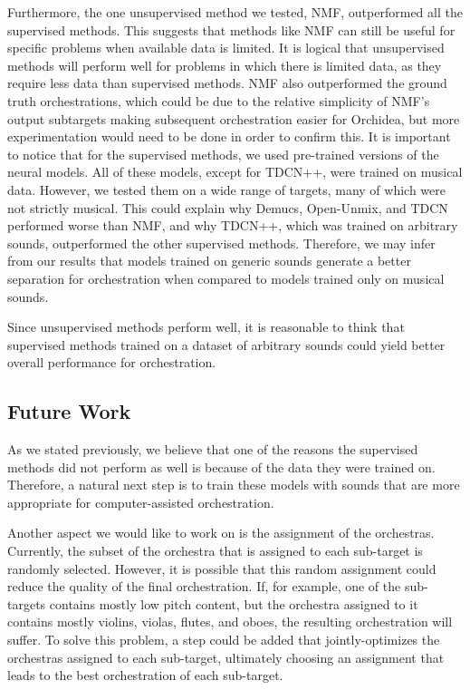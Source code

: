 \documentclass{article}
\begin{document}
  Furthermore, the one unsupervised method we tested, NMF, outperformed all the supervised methods. This suggests that methods like NMF can still be useful for specific problems when available data is limited. It is logical that unsupervised methods will perform well for problems in which there is limited data, as they require less data than supervised methods. NMF also outperformed the ground truth orchestrations, which could be due to the relative simplicity of NMF's output subtargets making subsequent orchestration easier for Orchidea, but more experimentation would need to be done in order to confirm this. It is important to notice that for the supervised methods, we used pre-trained versions of the neural models. All of these models, except for TDCN++, were trained on musical data. However, we tested them on a wide range of targets, many of which were not strictly musical. This could explain why Demucs, Open-Unmix, and TDCN performed worse than NMF, and why TDCN++, which was trained on arbitrary sounds, outperformed the other supervised methods. Therefore, we may infer from our results that models trained on generic sounds generate a better separation for orchestration when compared to models trained only on musical sounds.
  
  Since unsupervised methods perform well, it is reasonable to think that supervised methods trained on a dataset of arbitrary sounds could yield better overall performance for orchestration.
  
    \subsection{Future Work}\label{sec:futurework}  
    As we stated previously, we believe that one of the reasons the supervised methods did not perform as well is because of the data they were trained on. Therefore, a natural next step is to train these models with sounds that are more appropriate for computer-assisted orchestration.
    
    Another aspect we would like to work on is the assignment of the orchestras. Currently, the subset of the orchestra that is assigned to each sub-target is randomly selected. However, it is possible that this random assignment could reduce the quality of the final orchestration. If, for example, one of the sub-targets contains mostly low pitch content, but the orchestra assigned to it contains mostly violins, violas, flutes, and oboes, the resulting orchestration will suffer. To solve this problem, a step could be added that jointly-optimizes the orchestras assigned to each sub-target, ultimately choosing an assignment that leads to the best orchestration of each sub-target.
    
\end{document}
